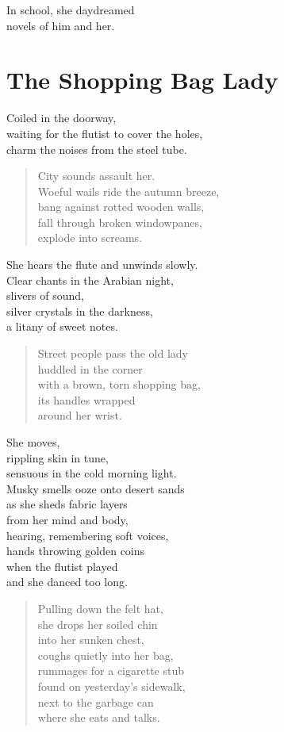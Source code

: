 \documentclass[twoside,10pt]{book}
\begin{document}
In school, she daydreamed\\
novels of him and her.


\clearpage
\section{The Shopping Bag Lady}

Coiled in the doorway,\\
waiting for the flutist to cover the holes,\\
charm the noises from the steel tube.

\begin{quote}
City sounds assault her.\\
Woeful wails ride the autumn breeze,\\
bang against rotted wooden walls,\\
fall through broken windowpanes,\\
explode into screams.
\end{quote}

She hears the flute and unwinds slowly.\\
Clear chants in the Arabian night,\\
slivers of sound,\\
silver crystals in the darkness,\\
a litany of sweet notes.

\begin{quote}
Street people pass the old lady\\
huddled in the corner\\
with a brown, torn shopping bag,\\
its handles wrapped\\
around her wrist.
\end{quote}

She moves,\\
rippling skin in tune,\\
sensuous in the cold morning light.\\
Musky smells ooze onto desert sands\\
as she sheds fabric layers\\
from her mind and body,\\
hearing, remembering soft voices,\\
hands throwing golden coins\\
when the flutist played\\
and she danced too long.

\begin{quote}
Pulling down the felt hat,\\
she drops her soiled chin\\
into her sunken chest,\\
coughs quietly into her bag,\\
rummages for a cigarette stub\\
found on yesterday's sidewalk,\\
next to the garbage can\\
where she eats and talks.
\end{quote}
\end{document}
